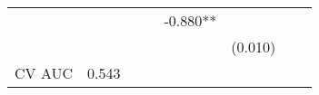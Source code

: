 \documentclass[]{article}
\begin{document}
\begin{longtable}[]{@{}lccccccc@{}}
\begin{minipage}[t]{0.09\columnwidth}
\strut
\end{minipage} & \begin{minipage}[t]{0.10\columnwidth}\centering\strut
\strut
\end{minipage} & \begin{minipage}[t]{0.10\columnwidth}\centering\strut
\strut
\end{minipage} & \begin{minipage}[t]{0.10\columnwidth}\centering\strut
\strut
\end{minipage} & \begin{minipage}[t]{0.10\columnwidth}\centering\strut
-0.880**\strut
\end{minipage} & \begin{minipage}[t]{0.10\columnwidth}\centering\strut
\strut
\end{minipage} & \begin{minipage}[t]{0.10\columnwidth}\centering\strut
\strut
\end{minipage}\tabularnewline
\begin{minipage}[t]{0.12\columnwidth}\raggedright\strut
\strut
\end{minipage} & \begin{minipage}[t]{0.09\columnwidth}\centering\strut
\strut
\end{minipage} & \begin{minipage}[t]{0.10\columnwidth}\centering\strut
\strut
\end{minipage} & \begin{minipage}[t]{0.10\columnwidth}\centering\strut
\strut
\end{minipage} & \begin{minipage}[t]{0.10\columnwidth}\centering\strut
\strut
\end{minipage} & \begin{minipage}[t]{0.10\columnwidth}\centering\strut
(0.010)\strut
\end{minipage} & \begin{minipage}[t]{0.10\columnwidth}\centering\strut
\strut
\end{minipage} & \begin{minipage}[t]{0.10\columnwidth}\centering\strut
\strut
\end{minipage}\tabularnewline
\begin{minipage}[t]{0.12\columnwidth}\raggedright\strut
CV AUC\strut
\end{minipage} & \begin{minipage}[t]{0.09\columnwidth}\centering\strut
0.543\strut
\end{minipage} & \begin{minipage}[t]{0.10\columnwidth}\centering\strut

\end{minipage}
\end{longtable}
\end{document}
